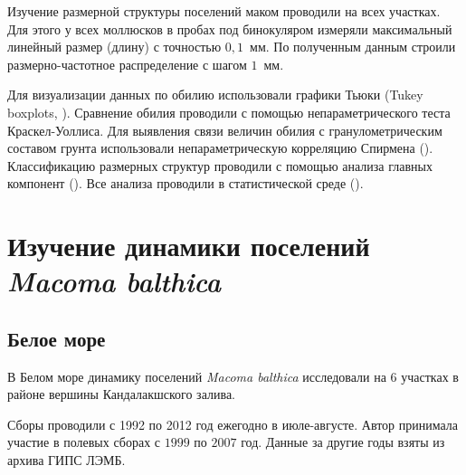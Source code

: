 Изучение размерной структуры поселений маком проводили на всех участках.
Для этого у всех моллюсков в пробах под бинокуляром измеряли максимальный линейный размер (длину) с точностью $0,1$~мм.
По полученным данным строили размерно-частотное распределение с шагом $1$~мм.


Для визуализации данных по обилию использовали графики Тьюки (Tukey boxplots, \cite{Tukey_1977}). 
Сравнение обилия проводили с помощью непараметрического теста Краскел-Уоллиса. 
Для выявления связи величин обилия с гранулометрическим составом грунта использовали непараметрическую корреляцию Спирмена (\cite{Hollander_et_al_2013}).
Классификацию размерных структур проводили с помощью анализа главных компонент (\cite{Mardia_et_al_1979}).
Все анализа проводили в статистической среде \R{} (\cite{R_2014}).

\afterpage{\clearpage}

	\section{Изучение динамики поселений {\it Macoma balthica}}
        \subsection{Белое море}
В Белом море динамику поселений {\it Macoma balthica} исследовали на $6$ участках в районе вершины Кандалакшского залива. 

Сборы проводили с 1992 по 2012 год ежегодно в июле-августе.
Автор принимала участие в полевых сборах с $1999$ по $2007$ год.
Данные за другие годы взяты из архива ГИПС ЛЭМБ.

